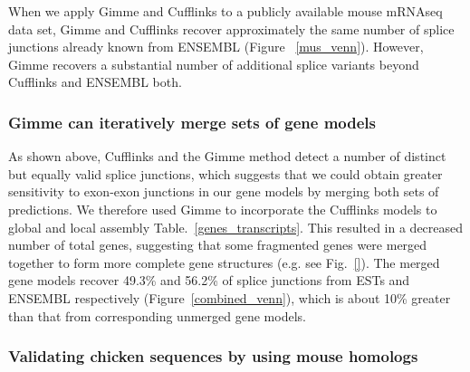 \documentclass[10pt]{article}
\begin{document}


When we apply Gimme and Cufflinks to a publicly available mouse mRNAseq data
set, Gimme and Cufflinks recover approximately the same number of splice
junctions already known from ENSEMBL (Figure ~\ref{mus_venn}).  However, Gimme
recovers a substantial number of additional splice variants beyond Cufflinks and
ENSEMBL both.



\subsubsection*{Gimme can iteratively merge sets of gene models}


As shown above, Cufflinks and the Gimme method detect a number of distinct but
equally valid splice junctions, which suggests that we could obtain greater
sensitivity to exon-exon junctions in our gene models by merging both sets of
predictions.  We therefore used Gimme to incorporate the Cufflinks models to
global and local assembly Table.~\ref{genes_transcripts}.  This resulted in a
decreased number of total genes, suggesting that some fragmented genes were
merged together to form more complete gene structures (e.g. see
Fig.~\ref{}). The merged gene models recover 49.3\% and 56.2\% of
splice junctions from ESTs and ENSEMBL respectively
(Figure~\ref{combined_venn}), which is about 10\% greater than that from
corresponding unmerged gene models.


\subsubsection*{Validating chicken sequences by using mouse homologs}
\end{document}
